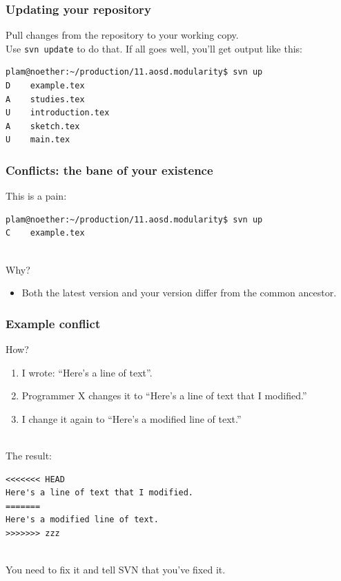 \begin{frame}[fragile]
\frametitle{Updating your repository}

\Large
\begin{changemargin}{1cm}
Pull changes from
the repository to your working copy. \\[1em]

Use {\tt svn update} to do that.
If all goes well, you'll get output like this:\\[1em]

{\scriptsize
\begin{verbatim}
plam@noether:~/production/11.aosd.modularity$ svn up
D    example.tex
A    studies.tex
U    introduction.tex
A    sketch.tex
U    main.tex
\end{verbatim}
}
\end{changemargin}

\end{frame}

\begin{frame}[fragile]
\frametitle{Conflicts: the bane of your existence}

\begin{changemargin}{1cm}
This is a pain:
{\scriptsize
\begin{verbatim}
plam@noether:~/production/11.aosd.modularity$ svn up
C    example.tex
\end{verbatim}
}
~\\[1em]

Why? 
\begin{itemize}
\item Both the latest version and your version differ
from the common ancestor.
\end{itemize}
\end{changemargin}
\end{frame}

\begin{frame}[fragile]
\frametitle{Example conflict}

\begin{changemargin}{1cm}
How?
\begin{enumerate}
\item I wrote: ``Here's a line of text''. 
\item Programmer X changes it to ``Here's a line of text that I modified.''
\item I change it again to ``Here's a modified line of text.''
\end{enumerate}
~\\[1em]

The result:
\begin{verbatim}
<<<<<<< HEAD
Here's a line of text that I modified.
=======
Here's a modified line of text.
>>>>>>> zzz
\end{verbatim}

~\\
You need to fix it and tell SVN that you've fixed it.

\end{changemargin}

\end{frame}

